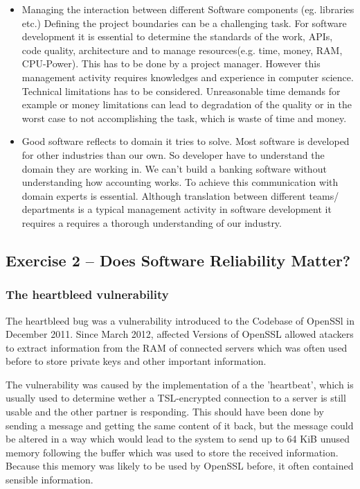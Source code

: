 \documentclass{scrartcl}
\begin{document}
\begin{itemize}
\item Managing the interaction between different Software components (eg. libraries etc.)
Defining the project boundaries can be a challenging task.
For software development it is essential to determine the standards of the work,
APIs, code quality, architecture and to manage resources(e.g. time, money, RAM, CPU-Power).
This has to be done by a project manager. However this management activity requires knowledges
and experience in computer science. Technical limitations has to be considered.
Unreasonable time demands for example or money limitations can lead to degradation of the quality
or in the worst case to not accomplishing the task, which is waste of time and money.

\item Good software reflects to domain it tries to solve.
Most software is developed for other industries than our own. So developer have to understand the domain they are working in. We can't build a banking software without understanding how accounting works.
To achieve this communication with domain experts is essential.
Although translation between different teams/ departments is a typical management activity in software development it requires a requires a thorough understanding of our industry.
\end{itemize}

\subsection*{Exercise 2 – Does Software Reliability Matter?}

\subsubsection*{The heartbleed vulnerability}

The heartbleed bug was a vulnerability introduced to the Codebase of OpenSSl in December 2011. Since March 2012, affected Versions of OpenSSL allowed atackers to extract information from the RAM of connected servers which was often used before to store private keys and other important information.

The vulnerability was caused by the implementation of a the 'heartbeat', which is usually used to determine wether a TSL-encrypted connection to a server is still usable and the other partner is responding. This should have been done by sending a message and getting the same content of it back, but the message could be altered in a way which would lead to the system to send up to 64 KiB unused memory following the buffer which was used to store the received information. Because this memory was likely to be used by OpenSSL before, it often contained sensible information.\\
\end{document}
